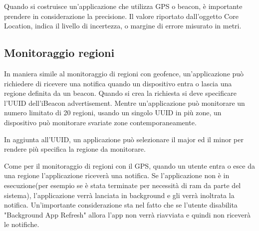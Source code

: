 Quando si costruisce un'applicazione che utilizza GPS o beacon, è importante prendere in considerazione la precisione.
Il valore riportato dall'oggetto Core Location, indica il livello di incertezza, o margine di errore misurato in metri. 

\subsection{Monitoraggio regioni}
In maniera simile al monitoraggio di regioni con geofence, un'applicazione può richiedere di ricevere una notifica quando un dispositivo entra o lascia una regione definita da un beacon. 
Quando si crea la richiesta si deve specificare l'UUID dell'iBeacon advertisement. Mentre un'applicazione può monitorare un numero limitato di 20 regioni, usando un singolo UUID in più zone, un dispositivo può monitorare svariate zone contemporaneamente.

In aggiunta all'UUID, un applicazione può selezionare il major ed il minor per rendere più specifica la regione da monitorare.

Come per il monitoraggio di regioni con il GPS, quando un utente entra o esce da una regione l'applicazione riceverà una notifica. 
Se l'applicazione non è in esecuzione(per esempio se è stata terminate per necessità di ram da parte del sistema), l'applicazione verrà lanciata in background e gli verrà inoltrata la notifica. 
Un'importante considerazione sta nel fatto che se l'utente disabilita "Background App Refresh" allora l'app non verrà riavviata e quindi non riceverà le notifiche.

